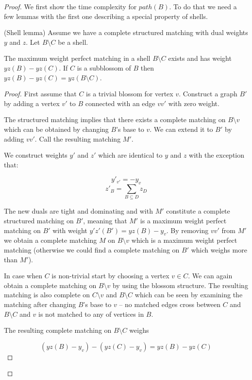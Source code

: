 \begin{proof}

    We first show the time complexity for $path(B)$. To do that we need a few lemmas with the first one describing a special property of shells.

\begin{lemma}{(Shell lemma)}\label{lem:shell}
    Assume we have a complete structured matching with dual weights $y$ and $z$. Let $B \setminus C$ be a shell.

    The maximum weight perfect matching in a shell $B \setminus C$ exists and has weight $yz(B) - yz(C)$. If $C$ is a subblossom of $B$ then $yz(B) - yz(C) = yz(B \setminus C)$. 
\end{lemma}

\begin{proof}
    First assume that $C$ is a trivial blossom for vertex $v$. Construct a graph $B'$ by adding a vertex $v'$ to $B$ connected with an edge $vv'$ with zero weight. 
    
    The structured matching implies that there exists a complete matching on $B \setminus v$ which can be obtained by changing $B$'s base to $v$. We can extend it to $B'$ by adding $vv'$. Call the resulting matching $M'$.

    We construct weights $y'$ and $z'$ which are identical to $y$ and $z$ with the exception that:

    \[y'_{v'} = -y_v \]
    \[z'_B = \sum_{B \subseteq D} z_D \]

    The new duals are tight and dominating and with $M'$ constitute a complete structured matching on $B'$, meaning that $M'$ is a maximum weight perfect matching on $B'$ with weight $y'z'(B') = yz(B) - y_v$. By removing $vv'$ from $M'$ we obtain a complete matching $M$ on $B \setminus v$ which is a maximum weight perfect matching (otherwise we could find a complete matching on $B'$ which weighs more than $M'$).

    In case when $C$ is non-trivial start by choosing a vertex $v \in C$. We can again obtain a complete matching on $B \setminus v$ by using the blossom structure. The resulting matching is also complete on $C \setminus v$ and $B \setminus C$ which can be seen by examining the matching after changing $B$'s base to $v$ – no matched edges cross between $C$ and $B \setminus C$ and $v$ is not matched to any of vertices in $B$.

    The resulting complete matching on $B \setminus C$ weighs

    \[ (yz(B) - y_v) - (yz(C) - y_v) = yz(B) - yz(C) \]


\end{proof}
\end{proof}
